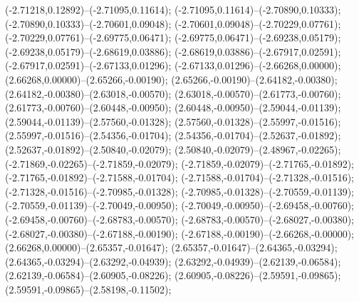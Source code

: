  (-2.71218,0.12892)--(-2.71095,0.11614);
 (-2.71095,0.11614)--(-2.70890,0.10333);
 (-2.70890,0.10333)--(-2.70601,0.09048);
 (-2.70601,0.09048)--(-2.70229,0.07761);
 (-2.70229,0.07761)--(-2.69775,0.06471);
 (-2.69775,0.06471)--(-2.69238,0.05179);
 (-2.69238,0.05179)--(-2.68619,0.03886);
 (-2.68619,0.03886)--(-2.67917,0.02591);
 (-2.67917,0.02591)--(-2.67133,0.01296);
 (-2.67133,0.01296)--(-2.66268,0.00000);
 (2.66268,0.00000)--(2.65266,-0.00190);
 (2.65266,-0.00190)--(2.64182,-0.00380);
 (2.64182,-0.00380)--(2.63018,-0.00570);
 (2.63018,-0.00570)--(2.61773,-0.00760);
 (2.61773,-0.00760)--(2.60448,-0.00950);
 (2.60448,-0.00950)--(2.59044,-0.01139);
 (2.59044,-0.01139)--(2.57560,-0.01328);
 (2.57560,-0.01328)--(2.55997,-0.01516);
 (2.55997,-0.01516)--(2.54356,-0.01704);
 (2.54356,-0.01704)--(2.52637,-0.01892);
 (2.52637,-0.01892)--(2.50840,-0.02079);
 (2.50840,-0.02079)--(2.48967,-0.02265);
 (-2.71869,-0.02265)--(-2.71859,-0.02079);
 (-2.71859,-0.02079)--(-2.71765,-0.01892);
 (-2.71765,-0.01892)--(-2.71588,-0.01704);
 (-2.71588,-0.01704)--(-2.71328,-0.01516);
 (-2.71328,-0.01516)--(-2.70985,-0.01328);
 (-2.70985,-0.01328)--(-2.70559,-0.01139);
 (-2.70559,-0.01139)--(-2.70049,-0.00950);
 (-2.70049,-0.00950)--(-2.69458,-0.00760);
 (-2.69458,-0.00760)--(-2.68783,-0.00570);
 (-2.68783,-0.00570)--(-2.68027,-0.00380);
 (-2.68027,-0.00380)--(-2.67188,-0.00190);
 (-2.67188,-0.00190)--(-2.66268,-0.00000);
 (2.66268,0.00000)--(2.65357,-0.01647);
 (2.65357,-0.01647)--(2.64365,-0.03294);
 (2.64365,-0.03294)--(2.63292,-0.04939);
 (2.63292,-0.04939)--(2.62139,-0.06584);
 (2.62139,-0.06584)--(2.60905,-0.08226);
 (2.60905,-0.08226)--(2.59591,-0.09865);
 (2.59591,-0.09865)--(2.58198,-0.11502);
